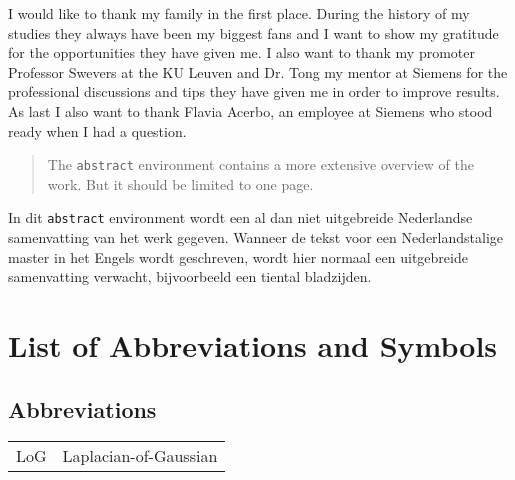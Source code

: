 \documentclass[master=elt,masteroption=eg,english]{kulemt}
\begin{document}

\begin{preface}
	I would like to thank my family in the first place. During the history of my studies they always have been my biggest fans and I want to show my gratitude for the opportunities they have given me. I also want to thank my promoter Professor Swevers at the KU Leuven and Dr. Tong my mentor at Siemens for the professional discussions and tips they have given me in order to improve results. As last I also want to thank Flavia Acerbo, an employee at Siemens who stood ready when I had a question. 

\end{preface}

\tableofcontents*

\begin{abstract}
  The \texttt{abstract} environment contains a more extensive overview of
  the work. But it should be limited to one page.

  \lipsum[1]
\end{abstract}

\begin{abstract*}
  In dit \texttt{abstract} environment wordt een al dan niet uitgebreide
  Nederlandse samenvatting van het werk gegeven.
  Wanneer de tekst voor een Nederlandstalige master in het Engels wordt
  geschreven, wordt hier normaal een uitgebreide samenvatting verwacht,
  bijvoorbeeld een tiental bladzijden. 

  \lipsum[1]
\end{abstract*}

\listoffiguresandtables
\chapter{List of Abbreviations and Symbols}
\section*{Abbreviations}
\begin{flushleft}
  \renewcommand{\arraystretch}{1.1}
  \begin{tabularx}{\textwidth}{@{}p{12mm}X@{}}
    LoG   & Laplacian-of-Gaussian \\
  \end{tabularx}
\end{flushleft}
\end{document}
